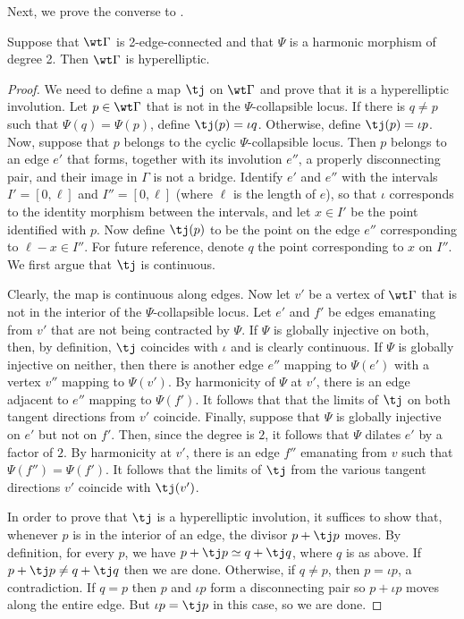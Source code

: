 Next, we prove the converse to .
\begin{theorem}\label{thm:harmonicImpliesHyperelliptic}
    Suppose that $\wt\Gamma$ is 2-edge-connected and that
    $\Psi$ is a  harmonic morphism of degree 2. Then $\wt\Gamma$ is hyperelliptic.

   
\end{theorem}

\begin{proof}
    We need to define a map $\tj$ on $\wt\Gamma$ and prove that it is a hyperelliptic involution.   Let $p\in\wt\Gamma$ that is not in the $\Psi$-collapsible locus.  If there is $q\neq p$ such that $\Psi(q)=\Psi(p)$, define  $\tj(p) = \iota q$. Otherwise, define $\tj(p) = \iota p$.  Now, suppose that $p$ belongs to the cyclic $\Psi$-collapsible locus.  Then $p$ belongs to an edge $e'$ that forms, together with its involution $e''$, a properly disconnecting pair, and their image in $\Gamma$ is not a bridge. 
 Identify $e'$ and $e''$ with the intervals $I'=[0,\ell]$ and $I''=[0,\ell]$ (where $\ell$ is the length of $e$), so that $\iota$ corresponds to the identity morphism between the intervals, and let $x\in I'$ be the point identified with  $p$. Now define   $\tj(p)$ to be the point on the edge $e''$ corresponding to $\ell-x\in I''$.   For future reference, denote $q$ the point corresponding to $x$ on $I''$.
    We first argue  that $\tj$ is  continuous. 
    
    Clearly, the map is continuous along edges. Now let $v'$ be a vertex of $\wt\Gamma$ that is not in the interior of the $\Psi$-collapsible locus. Let $e'$ and $f'$ be edges emanating from $v'$ that are not being contracted by $\Psi$. If $\Psi$ is globally injective on both, then, by definition, $\tj$ coincides with $\iota$ and is clearly continuous.  If $\Psi$ is globally injective on neither, then there is another edge $e''$ mapping to $\Psi(e')$ with a vertex $v''$ mapping to $\Psi(v')$. By harmonicity of $\Psi$ at $v'$, there is an edge adjacent to $e''$ mapping to $\Psi(f')$. It follows that that the limits of $\tj$ on both tangent directions from $v'$ coincide. 
    Finally, suppose that $\Psi$ is globally injective on $e'$ but not on $f'$. Then, since the degree is $2$, it follows that $\Psi$ dilates $e'$ by a factor of $2$. By harmonicity at $v'$,  there is an edge $f''$ emanating from $v$ such that $\Psi(f'') = \Psi(f')$. It follows that  the limits of $\tj$ from the various tangent directions $v'$ coincide with $\tj(v')$. 

   In order to prove that $\tj$ is a hyperelliptic involution,  it suffices to show that, whenever $p$ is in the interior of an edge, the divisor $p+\tj p$ moves. 
   By definition, for every $p$, we have $p + \tj p\simeq q + \tj q$, where $q$ is as above. If $p + \tj p \neq q + \tj q$ then we are done. Otherwise, if $q\neq p$, then $p = \iota p$, a contradiction. If $q = p$  
    then $p$ and $\iota p$  form a disconnecting pair so $p+\iota p$ moves along the entire edge. But $\iota p = \tj p$ in this case, so we are done. 
   \end{proof}

